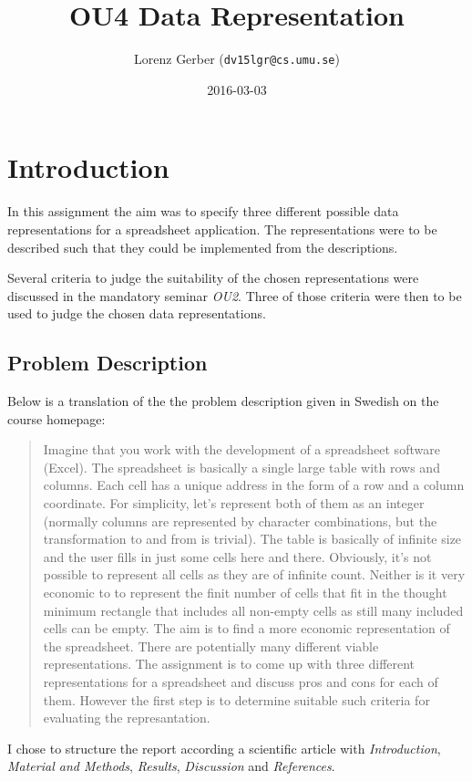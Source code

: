 \documentclass[a4paper,11pt,twoside]{article}
\title{OU4 Data Representation}
\author{Lorenz Gerber ({\tt{dv15lgr@cs.umu.se}})}
\date{2016-03-03}
\begin{document}
\lstset{language=C}
\maketitle

\tableofcontents
\newpage

\section{Introduction} 
In this assignment the aim was to specify three different possible
data representations for a spreadsheet application. The
representations were to be described such that they could be implemented
from the descriptions.
 
Several criteria to judge the suitability of the chosen representations were 
discussed in the mandatory seminar \emph{OU2}. Three of those criteria 
were then to be used to judge the chosen data representations.

\subsection{Problem Description}
Below is a translation of the the problem description given in Swedish
on the course homepage:

\begin{quote}
Imagine that you work with the development of a spreadsheet software
(Excel). The spreadsheet is basically a single large table with rows
and columns. Each cell has a unique address in the form of a row and a
column coordinate. For simplicity, let's represent both of them as an
integer (normally columns are represented by character combinations,
but the transformation to and from is trivial). The table is basically 
of infinite size and the user fills in just some cells here and
there. Obviously, it's not possible to represent all cells as they are
of infinite count. Neither is it very economic to to represent the
finit number of cells that fit in the thought minimum rectangle
that includes all non-empty cells as still many included cells can be
empty. The aim is to find a more economic representation of the
spreadsheet. There are potentially many different viable
representations. The assignment is to come up with three different
representations for a spreadsheet and discuss pros and cons for each
of them. However the first step is to determine suitable such criteria
for evaluating the represantation.
\end{quote}

I chose to structure the report according a scientific article
with \emph{Introduction}, \emph{Material and Methods}, \emph{Results},
\emph{Discussion} and \emph{References}. 
\end{document}

